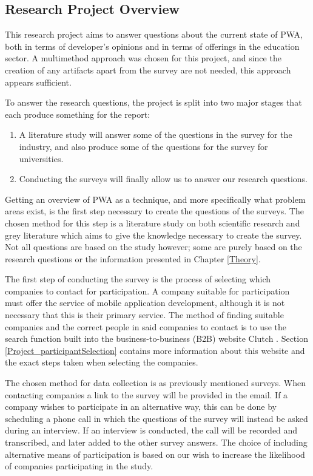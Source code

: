 \documentclass[a4paper,12pt]{article}
\begin{document}
\subsection{Research Project Overview}
\label{Method_project}
This research project aims to answer questions about the current state of PWA, both in terms of developer’s opinions and in terms of offerings in the education sector. A multimethod approach was chosen for this project, and since the creation of any artifacts apart from the survey are not needed, this approach appears sufficient.

To answer the research questions, the project is split into two major stages that each produce something for the report:

\begin{enumerate}
    \item A literature study will answer some of the questions in the survey for the industry, and also produce some of the questions for the survey for universities.
    \item Conducting the surveys will finally allow us to answer our research questions.
\end{enumerate}

Getting an overview of PWA as a technique, and more specifically what problem areas exist, is the first step necessary to create the questions of the surveys. The chosen method for this step is a literature study on both scientific research and grey literature which aims to give the knowledge necessary to create the survey. Not all questions are based on the study however; some are purely based on the research questions or the information presented in Chapter \ref{Theory}.

The first step of conducting the survey is the process of selecting which companies to contact for participation. A company suitable for participation must offer the service of mobile application development, although it is not necessary that this is their primary service. The method of finding suitable companies and the correct people in said companies to contact is to use the search function built into the business-to-business (B2B) website Clutch \cite{clutch}. Section \ref{Project_participantSelection} contains more information about this website and the exact steps taken when selecting the companies.

The chosen method for data collection is as previously mentioned surveys. When contacting companies a link to the survey will be provided in the email. If a company wishes to participate in an alternative way, this can be done by scheduling a phone call in which the questions of the survey will instead be asked during an interview. If an interview is conducted, the call will be recorded and transcribed, and later added to the other survey answers. The choice of including alternative means of participation is based on our wish to increase the likelihood of companies participating in the study.
\end{document}
